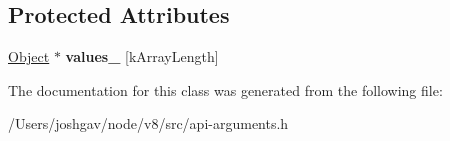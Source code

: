 \subsection*{Protected Attributes}
\begin{DoxyCompactItemize}
\item 
\hyperlink{classv8_1_1internal_1_1_object}{Object} $\ast$ {\bfseries values\+\_\+} \mbox{[}k\+Array\+Length\mbox{]}\hypertarget{classv8_1_1internal_1_1_custom_arguments_base_a1a42a0ba080930803cec7eb99ab30b9f}{}\label{classv8_1_1internal_1_1_custom_arguments_base_a1a42a0ba080930803cec7eb99ab30b9f}

\end{DoxyCompactItemize}


The documentation for this class was generated from the following file\+:\begin{DoxyCompactItemize}
\item 
/\+Users/joshgav/node/v8/src/api-\/arguments.\+h\end{DoxyCompactItemize}
